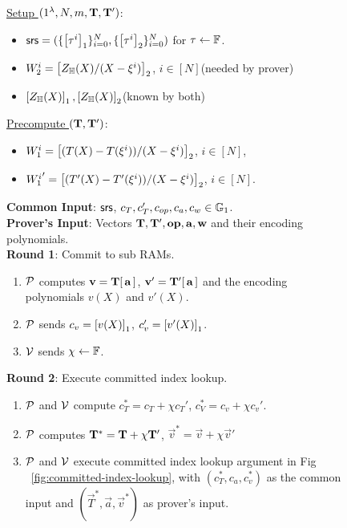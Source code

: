 \begin{figure}[t!]
    \begin{mdframed}

        \underline{Setup $(1^{\lambda},N,m, \mathbf{T}, \mathbf{T}')$}:
        \begin{itemize}[leftmargin=1em]
            \item $\mathsf{srs} = (\{\left[{\tau^i}\right]_1\}_{i=0}^N, \{\left[{\tau^i}\right]_2\}_{i=0}^N)$ for $\tau\gets \mathbb{F}$.
            \item $W_2^i=\left[{Z_\mathbb{H}(X)/(X-\xi^i)}\right]_2$, $i\in [N]$(needed by prover)
            \item $\left[{Z_\mathbb{H}(X)}\right]_1, \left[{Z_\mathbb{H}(X)}\right]_2$(known by both)
        \end{itemize}

        \underline{Precompute $(\mathbf{T}, \mathbf{T}')$}:
        \begin{itemize}[leftmargin=1em]
            \item $W_1^i=\left[{(T(X)-T(\xi^i))/(X-\xi^i)}\right]_2$, $i\in [N]$,
            \item ${W_1^i}'=\left[{(T'(X) - T'(\xi^i))/(X-\xi^i)}\right]_2$, $i\in [N]$.
        \end{itemize}

        {\bf Common Input}: $\mathsf{srs}$, $c_T, c_T', c_{op}, c_a, c_w\in \mathbb{G}_1$.\\
        {\bf Prover's Input}: Vectors $\mathbf{T},\mathbf{T}',\mathbf{{op}},\mathbf{a},\mathbf{w}$ and their encoding polynomials.\\

        {\bf Round 1}: Commit to sub RAMs.
        \begin{enumerate}[leftmargin=1em, label=\arabic*.]
            \item $\mathcal{P}$ computes $\mathbf{v}=\mathbf{T}[\,\mathbf{a}\,]$, $\mathbf{v}'=\mathbf{T}'[\,\mathbf{a}\,]$ and the encoding
            polynomials $v(X)$ and $v'(X)$.
            \item $\mathcal{P}$ sends $c_v = \left[{v(X)}\right]_1$, $c_v'=\left[{v'(X)}\right]_1$.
            \item $\mathcal{V}$ sends $\chi\gets \mathbb{F}$.
        \end{enumerate}

        {\bf Round 2}: Execute committed index lookup.
        \begin{enumerate}[leftmargin=1em, label=\arabic*.]
            \item $\mathcal{P}$ and $\mathcal{V}$ compute $c_T^\ast=c_T + \chi c_T'$, $c_V^\ast=c_v + \chi c_v'$.
            \item $\mathcal{P}$ computes $\mathbf{T}^\ast = \mathbf{T} + \chi \mathbf{T}'$, $\vec{v}^\ast = \vec{v} + \chi \vec{v}'$
            \item $\mathcal{P}$ and $\mathcal{V}$ execute committed index lookup argument in Fig ~\ref{fig:committed-index-lookup},
            with $(c_T^\ast,c_a,c_v^\ast)$ as the common input and $(\vec{T}^\ast, \vec{a},\vec{v}^\ast)$ as prover's input.
        \end{enumerate}


\end{mdframed}
\end{figure}

